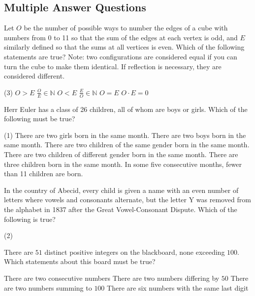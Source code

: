 \documentclass{article}
\begin{document}
\subsection{Multiple Answer Questions}
\begin{problem}
Let $O$ be the number of possible ways to number the edges of a cube with numbers from 0 to 11 so that the sum of the edges at each vertex is odd, and $E$ similarly defined so that the sums at all vertices is even. Which of the following statements are true?
Note: two configurations are considered equal if you can turn the cube to make them identical. If reflection is necessary, they are considered different. 
\end{problem}
\begin{tasks}(3)
\task $O > E$
\task $\frac{O}{E} \in \mathbb{N}$
\task $O < E$
\task $\frac{E}{O} \in \mathbb{N}$
\task $O = E$
\task $O \cdot E = 0$
\end{tasks}

\begin{problem}
Herr Euler has a class of 26 children, all of whom are boys or girls. Which of the following must be true?
\end{problem}
\begin{tasks}(1)
\task There are two girls born in the same month.
\task There are two boys born in the same month.
\task There are two children of the same gender born in the same month.
\task There are two children of different gender born in the same month.
\task There are three children born in the same month.
\task In some five consecutive months, fewer than 11 children are born.
\end{tasks}

\begin{problem}
In the country of Abecid, every child is given a name with an even number of letters where vowels and consonants alternate, but the letter Y was removed from the alphabet in 1837 after the Great Vowel-Consonant Dispute. Which of the following is true?

\begin{tasks}(2)
\task 
\end{tasks}
\answer{}
\end{problem}
 
\begin{problem}
There are $51$ distinct positive integers on the blackboard, none exceeding $100$. Which statements about this board must be true?
\begin{tasks2}
\task There are two consecutive numbers
\task There are two numbers differing by $50$
\task There are two numbers summing to $100$
\task There are six numbers with the same last digit
\end{tasks2}
\end{problem}
\end{document}
